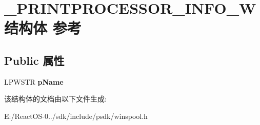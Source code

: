 \hypertarget{struct___p_r_i_n_t_p_r_o_c_e_s_s_o_r___i_n_f_o__1_w}{}\section{\+\_\+\+P\+R\+I\+N\+T\+P\+R\+O\+C\+E\+S\+S\+O\+R\+\_\+\+I\+N\+F\+O\+\_\+W结构体 参考}
\label{struct___p_r_i_n_t_p_r_o_c_e_s_s_o_r___i_n_f_o__1_w}
\subsection*{Public 属性}
\begin{DoxyCompactItemize}
\item 
\mbox{\label{struct___p_r_i_n_t_p_r_o_c_e_s_s_o_r___i_n_f_o__1_w_abfe7834196c7c6569004a6fdf3e65a9f}} 
L\+P\+W\+S\+TR {\bfseries p\+Name}
\end{DoxyCompactItemize}


该结构体的文档由以下文件生成\+:\begin{DoxyCompactItemize}
\item 
E\+:/\+React\+O\+S-\/0../sdk/include/psdk/winspool.\+h\end{DoxyCompactItemize}
